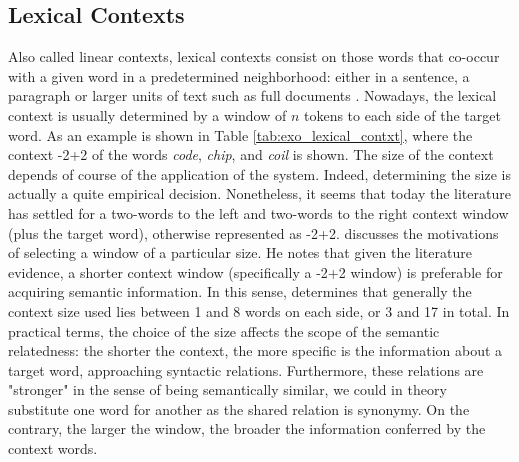 

\subsection{Lexical Contexts}
Also called linear contexts, lexical contexts consist on those  words that co-occur with a given word in a predetermined neighborhood: either in a sentence, a paragraph or larger units of text such as full documents \cite{LevyG14,sahlgren2008distributional}. Nowadays, the lexical context is usually determined by a window of $n$ tokens to each side of the target word. As an example is shown in Table \ref{tab:exo_lexical_contxt}, where the context -2+2 of the words \textit{code}, \textit{chip}, and \textit{coil} is shown. The size of the context depends of course of the application of the system. Indeed, determining the size  is actually a quite empirical decision. Nonetheless, it seems that today the literature \cite{Daume2006,mikolov2013distributed,LevyG14,levy2014neural}  has settled for a two-words to the left and two-words to the right context window (plus the target word), otherwise represented as -2+2. \cite{sahlgren2006word} discusses  the motivations of selecting a window of a particular size. He notes that given the literature evidence,  a shorter context window (specifically a -2+2 window) is preferable for acquiring semantic information. In this sense, \cite{JurafskyM09} determines that generally the context size used lies between 1 and 8 words on each side, or 3 and 17 in total. In practical terms, the choice of the size  affects the scope of the semantic relatedness: the shorter the context, the more specific is the information about a target word, approaching syntactic relations. Furthermore, these relations are "stronger" in the sense of being semantically similar, we could in theory substitute one word for another as the shared relation is synonymy. On the contrary, the larger the window, the broader the information conferred by the context words. 



